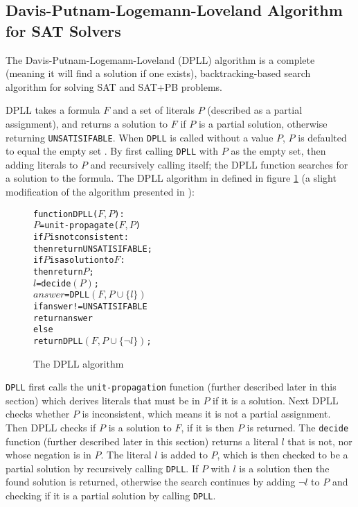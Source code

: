 \subsection{Davis-Putnam-Logemann-Loveland Algorithm for SAT Solvers}
The Davis-Putnam-Logemann-Loveland (DPLL) algorithm \citep{Davis1960, davis1962machine} is a complete (meaning it will find a solution if one exists), 
backtracking-based search algorithm for solving SAT and SAT+PB problems.


DPLL takes a formula $F$ and a set of literals $P$ (described as a partial assignment), and returns a solution to $F$ if $P$ is a partial solution, 
otherwise returning \verb+UNSATISIFABLE+.
When \texttt{DPLL} is called without a value $P$, $P$ is defaulted to equal the empty set .
By first calling \texttt{DPLL} with $P$ as the empty set, then adding literals to $P$ and recursively calling itself; 
the DPLL function searches for a solution to the formula.
The DPLL algorithm in defined in figure \ref{impl.DPLL} (a slight modification of the algorithm presented in \citep{dixon2004automating}):
\begin{figure}[h]
\begin{center}
\begin{alltt}
function DPLL(\(F, P\)):
   \(P\) = unit-propagate(\(F, P\))
   if \(P\) is not consistent:
       then return UNSATISIFABLE;
   if \(P\) is a solution to \(F\):
       then return \(P\);
   \(l\) = decide\((P)\);
   \(answer\) = DPLL\((F, P \cup \{l\})\)
   if answer != UNSATISIFABLE 
       return answer
   else
       return DPLL\((F, P \cup \{\neg l\})\);
\end{alltt}
  \caption{The DPLL algorithm}
  \label{impl.DPLL}
\end{center}
\end{figure}

\texttt{DPLL} first calls the \texttt{unit-propagation} function (further described later in this section) which derives literals that must be in $P$ if it is a solution.
Next DPLL checks whether $P$ is inconsistent, which means it is not a partial assignment.
Then DPLL checks if $P$ is a solution to $F$, if it is then $P$ is returned.
The \texttt{decide} function (further described later in this section) returns a literal $l$ that is not, nor whose negation is in $P$.
The literal $l$ is added to $P$, which is then checked to be a partial solution by recursively calling \texttt{DPLL}.
If $P$ with $l$ is a solution then the found solution is returned,
otherwise the search continues by adding $\neg l$ to $P$ and checking if it is a partial solution by calling \texttt{DPLL}.

